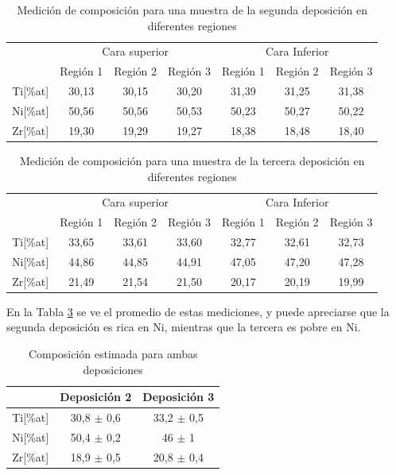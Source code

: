 \documentclass[12pt]{article}
\theoremstyle{definition}
\theoremstyle{remark}
\begin{document}
{\begin{table}[H]
\begin{tabular}{c|c|c|c|c|c|c|}
\cline{2-7}
\multicolumn{1}{l|}{} & \multicolumn{3}{c|}{Cara superior} & \multicolumn{3}{c|}{Cara Inferior} \\ \cline{2-7} 
\multicolumn{1}{l|}{} & Región 1 & Región 2 & Región 3 & Región 1 & Región 2 & Región 3 \\ \hline
\multicolumn{1}{|c|}{Ti{[}\%at{]}} & 30,13 & 30,15 & 30,20 & 31,39 & 31,25 & 31,38 \\ \hline
\multicolumn{1}{|c|}{Ni{[}\%at{]}} & 50,56 & 50,56 & 50,53 & 50,23 & 50,27 & 50,22 \\ \hline
\multicolumn{1}{|c|}{Zr{[}\%at{]}} & 19,30 & 19,29 & 19,27 & 18,38 & 18,48 & 18,40 \\ \hline
\end{tabular}
\caption{Medición de composición para una muestra de la segunda deposición en diferentes regiones}
\label{composition2}
\end{table}

\begin{table}[H]
\begin{tabular}{c|c|c|c|c|c|c|}
\cline{2-7}
\multicolumn{1}{l|}{} & \multicolumn{3}{c|}{Cara superior} & \multicolumn{3}{c|}{Cara Inferior} \\ \cline{2-7} 
\multicolumn{1}{l|}{} & Región 1 & Región 2 & Región 3 & Región 1 & Región 2 & Región 3 \\ \hline
\multicolumn{1}{|c|}{Ti{[}\%at{]}} & 33,65 & 33,61 & 33,60 & 32,77 & 32,61 & 32,73 \\ \hline
\multicolumn{1}{|c|}{Ni{[}\%at{]}} & 44,86 & 44,85 & 44,91 & 47,05 & 47,20 & 47,28 \\ \hline
\multicolumn{1}{|c|}{Zr{[}\%at{]}} & 21,49 & 21,54 & 21,50 & 20,17 & 20,19 & 19,99 \\ \hline
\end{tabular}
\caption{Medición de composición para una muestra de la tercera deposición en diferentes regiones}
\label{composition3}
\end{table}

En la Tabla \ref{compositionAvg} se ve el promedio de estas mediciones, y puede apreciarse que la segunda deposición es rica en Ni, mientras que la tercera es pobre en Ni.


\begin{table}[H]
\centering
\begin{tabular}{c|c|c|}
\cline{2-3}
\multicolumn{1}{l|}{} & Deposición 2 & Deposición 3 \\ \hline
\multicolumn{1}{|c|}{Ti{[}\%at{]}} & 30,8 $\pm$ 0,6 & 33,2 $\pm$ 0,5 \\ \hline
\multicolumn{1}{|c|}{Ni{[}\%at{]}} & 50,4 $\pm$ 0,2 & 46 $\pm$ 1 \\ \hline
\multicolumn{1}{|c|}{Zr{[}\%at{]}} & 18,9 $\pm$ 0,5 & 20,8 $\pm$ 0,4 \\ \hline
\end{tabular}
\caption{Composición estimada para ambas deposiciones}
\label{compositionAvg}
\end{table}

}
\end{document}

